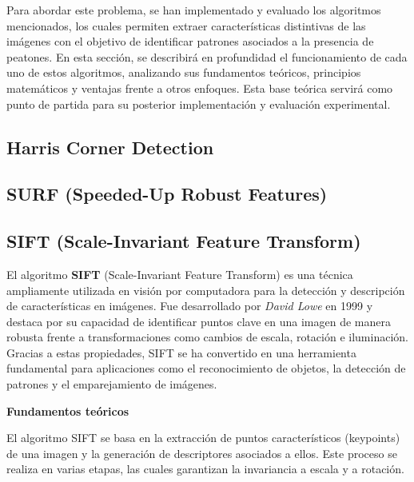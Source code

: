 \documentclass[a4paper]{article}
\begin{document}
 Para abordar este problema, se han implementado y evaluado los algoritmos mencionados, 
 los cuales permiten extraer características distintivas de las imágenes con el objetivo de identificar patrones asociados 
 a la presencia de peatones. En esta sección, se describirá en profundidad el funcionamiento de cada uno de estos algoritmos, analizando sus fundamentos teóricos, principios matemáticos y ventajas frente a otros enfoques. Esta base teórica servirá como punto de partida para su posterior implementación y evaluación experimental.
 

  \subsection{Harris Corner Detection}
  \par\vspace{0.5cm}




  \subsection{SURF (Speeded-Up Robust Features)}
  \par\vspace{0.5cm}

  \subsection{SIFT (Scale-Invariant Feature Transform)}
  \par\vspace{0.5cm}
  
  El algoritmo \textbf{SIFT} (Scale-Invariant Feature Transform) es una técnica ampliamente utilizada en visión por computadora para la detección y descripción de características en imágenes. Fue desarrollado por \textit{David Lowe} en 1999 y destaca por su capacidad de identificar puntos clave en una imagen de manera robusta frente a transformaciones como cambios de escala, rotación e iluminación. Gracias a estas propiedades, SIFT se ha convertido en una herramienta fundamental para aplicaciones como el reconocimiento de objetos, la detección de patrones y el emparejamiento de imágenes.
  
  \par\vspace{0.5cm}
  \textbf{Fundamentos teóricos}
  \par\vspace{0.5cm}
  
  El algoritmo SIFT se basa en la extracción de puntos característicos (keypoints) de una imagen y la generación de descriptores asociados a ellos. Este proceso se realiza en varias etapas, las cuales garantizan la invariancia a escala y a rotación.
  
\end{document}
